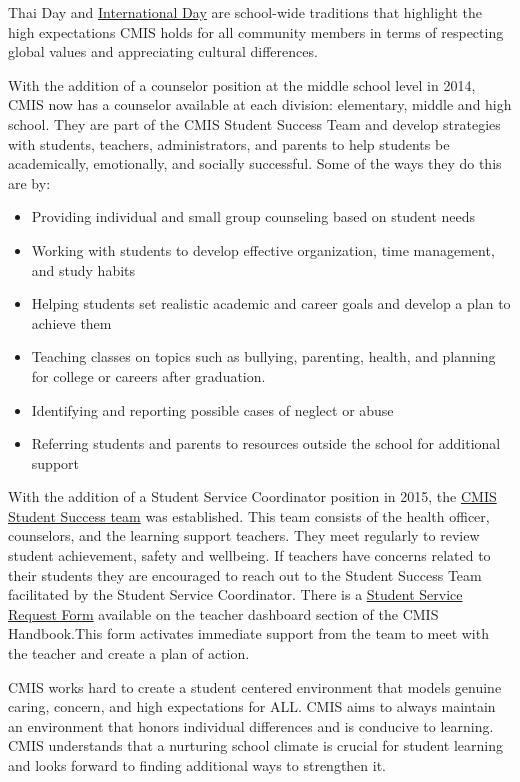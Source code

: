 \begin{findings}
Thai Day and \href{https://docs.google.com/a/cmis.ac.th/document/d/1YGCBI_uQVVcvOvw4c_Q2GcoJQzadFou1_6WtBAMTTaE/edit?usp=sharing}{International Day} are school-wide traditions that highlight the high expectations CMIS holds for all community members in terms of respecting global values and appreciating cultural differences. 

With the addition of a counselor position at the middle school level in 2014, CMIS now has a counselor available at each division: elementary, middle and high school. They are part of the CMIS Student Success Team and develop strategies with students, teachers, administrators, and parents to help students be academically, emotionally, and socially successful. Some of the ways they do this are by:

\begin{itemize}
\item Providing individual and small group counseling based on student needs
\item Working with students to develop effective organization, time management, and study habits
\item Helping students set realistic academic and career goals and develop a plan to achieve them
\item Teaching classes on topics such as bullying, parenting, health, and planning for college or careers after graduation.
\item Identifying and reporting possible cases of neglect or abuse
\item Referring students and parents to resources outside the school for additional support
\end{itemize}

With the addition of a Student Service Coordinator position in 2015, the \href{https://docs.google.com/a/cmis.ac.th/presentation/d/1sWhr1U3qZIGEu2aQdWOl0OQ5Rkd8iRGWmUlszEJLz2o/edit?usp=sharing}{CMIS Student Success team} was established. This team consists of the health officer, counselors, and the learning support teachers. They meet regularly to review student achievement,  safety and wellbeing. If teachers have concerns related to their students they are encouraged to reach out to the Student Success Team facilitated by the Student Service Coordinator. There is a \href{https://docs.google.com/a/cmis.ac.th/forms/d/e/1FAIpQLScVtFtaEXarGOjwsiJyGdbLAMbeNzG9m44i1fWXFLbtMKZcUg/viewform}{Student Service Request Form} available on the teacher dashboard section of the CMIS Handbook.This form activates immediate support from the team to meet with the teacher and create a plan of action.


CMIS works hard to create a student centered environment that models genuine caring, concern, and high expectations for ALL. CMIS aims to always maintain an environment that honors individual differences and is conducive to learning. CMIS understands that a nurturing school climate is crucial for student learning and looks forward to finding additional ways to strengthen it.
\end{findings}

